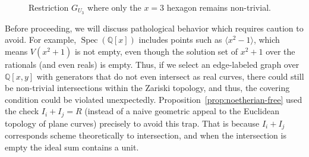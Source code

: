 \documentclass{article}
\newcommand{\Q}{\mathbb Q}
\DeclareMathOperator{\Spec}{Spec}
\begin{document}
\begin{figure}
\centering
{}
\caption{Restriction $G_{U_3}$ where only the $x=3$ hexagon remains non-trivial.}
\label{fig:restrict-U3}
\end{figure} 


Before proceeding, we will discuss pathological behavior which requires caution to avoid. For example, $\Spec(\Q[x])$ includes points such as $\langle x^2-1 \rangle$, which means $V(x^2+1)$ is not empty, even though the solution set of $x^2+1$ over the rationals (and even reals) is empty. Thus, if we select an edge-labeled graph over $\Q[x,y]$ with generators that do not even intersect as real curves, there could still be non-trivial intersections within the Zariski topology, and thus, the covering condition could be violated unexpectedly. Proposition~\ref{prop:noetherian-free} used the check $I_i+I_j=R$ (instead of a naive geometric appeal to the Euclidean topology of plane curves) precisely to avoid this trap. That is because $I_i+I_j$ corresponds scheme theoretically to intersection, and when the intersection is empty the ideal sum contains a unit. 
\end{document}
